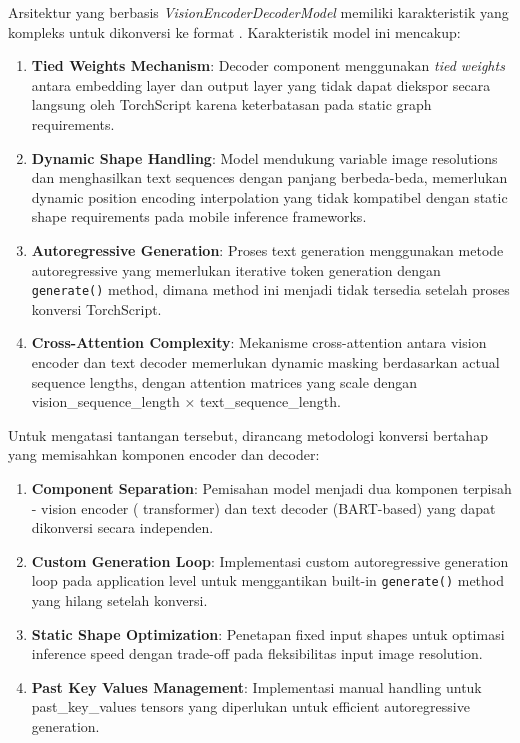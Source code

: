 Arsitektur \donut{} yang berbasis \textit{VisionEncoderDecoderModel} memiliki karakteristik yang kompleks untuk dikonversi ke format \onnx{}. Karakteristik model ini mencakup:

\begin{enumerate}
    \item \textbf{Tied Weights Mechanism}: Decoder component menggunakan \emph{tied weights} antara embedding layer dan output layer yang tidak dapat diekspor secara langsung oleh TorchScript karena keterbatasan pada static graph requirements.
    
    \item \textbf{Dynamic Shape Handling}: Model mendukung variable image resolutions dan menghasilkan text sequences dengan panjang berbeda-beda, memerlukan dynamic position encoding interpolation yang tidak kompatibel dengan static shape requirements pada mobile inference frameworks.
    
    \item \textbf{Autoregressive Generation}: Proses text generation menggunakan metode autoregressive yang memerlukan iterative token generation dengan \texttt{generate()} method, dimana method ini menjadi tidak tersedia setelah proses konversi TorchScript.
    
    \item \textbf{Cross-Attention Complexity}: Mekanisme cross-attention antara vision encoder dan text decoder memerlukan dynamic masking berdasarkan actual sequence lengths, dengan attention matrices yang scale dengan vision\_sequence\_length × text\_sequence\_length.
\end{enumerate}

\label{subsubsubsec:metodologi-konversi-bertahap}
Untuk mengatasi tantangan tersebut, dirancang metodologi konversi bertahap yang memisahkan komponen encoder dan decoder:

\begin{enumerate}
    \item \textbf{Component Separation}: Pemisahan model menjadi dua komponen terpisah - vision encoder (\swin{} transformer) dan text decoder (BART-based) yang dapat dikonversi secara independen.
    
    \item \textbf{Custom Generation Loop}: Implementasi custom autoregressive generation loop pada application level untuk menggantikan built-in \texttt{generate()} method yang hilang setelah konversi.
    
    \item \textbf{Static Shape Optimization}: Penetapan fixed input shapes untuk optimasi inference speed dengan trade-off pada fleksibilitas input image resolution.
    
    \item \textbf{Past Key Values Management}: Implementasi manual handling untuk past\_key\_values tensors yang diperlukan untuk efficient autoregressive generation.
\end{enumerate}
